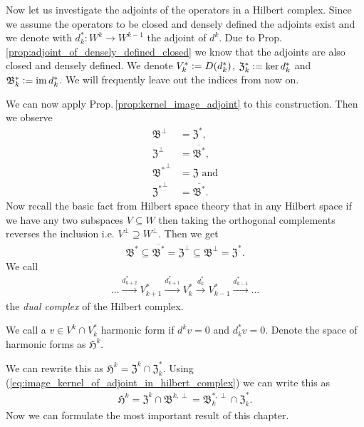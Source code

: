 \documentclass[../master_thesis.tex]{subfiles}
\begin{document}
Now let us investigate the adjoints of the operators in a Hilbert complex.
Since we assume the operators to be closed and densely defined the adjoints 
exist and we denote with $d_k^*:W^k \rightarrow W^{k-1}$ the adjoint of $d^k$.
Due to Prop.\,\ref{prop:adjoint_of_densely_defined_closed} we know that the 
adjoints are also closed and densely defined. We denote 
$V_k^* \vcentcolon= D(d_k^*)$, $\mathfrak{Z}^*_k \vcentcolon= \ker d^*_k$ 
and $\mathfrak{B}^*_k \vcentcolon= \operatorname{im} d^*_k$. We will frequently leave out 
the indices from now on.

We can now apply Prop.\,\ref{prop:kernel_image_adjoint} to this construction. 
Then we observe 
\begin{align*}
    \mathfrak{B}^\perp &= \mathfrak{Z}^*,
    \\ \mathfrak{Z}^\perp &= \overline{\mathfrak{B}^*},
    \\ \mathfrak{B^*}^\perp &= \mathfrak{Z} \text{ and}
    \\ \mathfrak{Z^*}^\perp &= \overline{\mathfrak{B}^*}.
\end{align*}
Now recall the basic fact from Hilbert space theory that 
in any Hilbert space if we have any two subspaces $V \subseteq W$ then taking the 
orthogonal complements reverses the inclusion i.e.
$V^\perp \supseteq W^\perp$. Then we get 
\begin{align}
    \mathfrak{B}^* \subseteq \overline{\mathfrak{B}^*} 
    = \mathfrak{Z}^\perp  \subseteq \mathfrak{B}^\perp 
    = \mathfrak{Z}^*. \label{eq:image_kernel_of_adjoint_in_hilbert_complex}
\end{align}
We call 
\begin{align*}
    \dots \xrightarrow{d^*_{k+2}} V^*_{k+1}  \xrightarrow{d^*_{k+1}} V^*_{k}
    \xrightarrow{d^*_{k}} V^*_{k-1} \xrightarrow{d^*_{k-1}} \dots
\end{align*}
the \textit{dual complex} of the Hilbert complex.

\begin{definition}
    We call a $v \in V^k \cap V^*_k$ harmonic form if $d^k v = 0$ and 
    $d^*_k v = 0$. Denote the space of harmonic forms as 
    $\mathfrak{H}^k$.
\end{definition}
\noindent We can rewrite this as $\mathfrak{H}^k = \mathfrak{Z}^k 
\cap \mathfrak{Z}^*_k$. Using 
(\ref{eq:image_kernel_of_adjoint_in_hilbert_complex}) we can write this as
\begin{align*}
    \mathfrak{H}^k = \mathfrak{Z}^k \cap \mathfrak{B}^{k,\perp}
         = \mathfrak{B}_k^{*,\perp} \cap \mathfrak{Z}^*_k.
\end{align*}
Now we can formulate the most important 
result of this chapter. 
\end{document}
